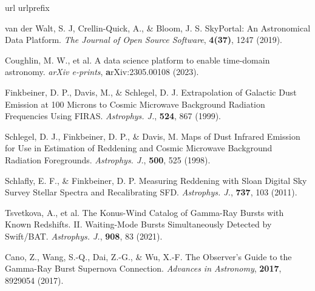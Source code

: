 \documentclass{nature_plusfigure}
\newcommand{\apj}{{Astrophys. J.}}
\begin{document}
\begin{methods}
\vspace{1in}
%
%

\begin{thebibliography}{10}
\expandafter\ifx\csname url\endcsname\relax
  \def\url#1{\texttt{#1}}\fi
\expandafter\ifx\csname urlprefix\endcsname\relax\def\urlprefix{URL }\fi
\providecommand{\bibinfo}[2]{#2}
\providecommand{\eprint}[2][]{\url{#2}}
\makeatletter
\addtocounter{\@listctr}{74}
\makeatother



  van der Walt, S. J, Crellin-Quick, A., \& Bloom, J. S. SkyPortal: An Astronomical Data Platform. \emph{The Journal of Open Source Software}, \textbf{4(37)}, 1247 (2019). 

  Coughlin, M. W., et al. A data science platform to enable time-domain astronomy. \emph{arXiv e-prints}, \textbf arXiv:2305.00108 (2023). 



  Finkbeiner, D. P., Davis, M., \& Schlegel, D. J. Extrapolation of Galactic Dust Emission at 100 Microns to Cosmic Microwave Background Radiation Frequencies Using FIRAS. \emph{\apj}, \textbf{524}, 867 (1999). 
 
  Schlegel, D. J., Finkbeiner, D. P., \& Davis, M. Maps of Dust Infrared Emission for Use in Estimation of Reddening and Cosmic Microwave Background Radiation Foregrounds. \emph{\apj}, \textbf{500}, 525 (1998). 

  Schlafly, E. F., \& Finkbeiner, D. P. Measuring Reddening with Sloan Digital Sky Survey Stellar Spectra and Recalibrating SFD. \emph{\apj}, \textbf{737}, 103 (2011). 
 

 Tsvetkova, A., et al. The Konus-Wind Catalog of Gamma-Ray Bursts with Known Redshifts. II. Waiting-Mode Bursts Simultaneously Detected by Swift/BAT. \emph{\apj}, \textbf{908}, 83 (2021). 

 Cano, Z., Wang, S.-Q., Dai, Z.-G., \& Wu, X.-F. The Observer's Guide to the Gamma-Ray Burst Supernova Connection. \emph{Advances in Astronomy}, \textbf{2017}, 8929054 (2017). 
 

\end{thebibliography}
\end{methods}
\end{document}
